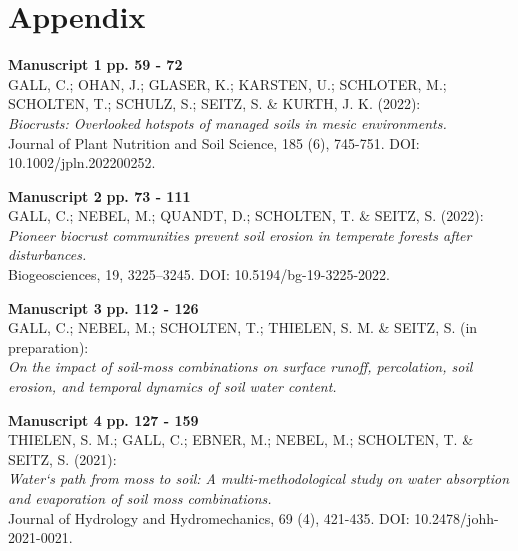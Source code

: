 \chapter*{Appendix}
\label{chap:appendix_overview} %


\noindent %
\textbf{Manuscript 1} \hfill \textbf{pp. 59 - 72} \\ %
GALL, C.; OHAN, J.; GLASER, K.; KARSTEN, U.; SCHLOTER, M.; SCHOLTEN, T.; SCHULZ, S.; SEITZ, S. \& KURTH, J. K. (2022): \\
\textit{Biocrusts: Overlooked hotspots of managed soils in mesic environments.} \\
Journal of Plant Nutrition and Soil Science, 185 (6), 745-751. DOI: 10.1002/jpln.202200252.

\vspace{\baselineskip} %

\noindent
\textbf{Manuscript 2} \hfill \textbf{pp. 73 - 111} \\ %
GALL, C.; NEBEL, M.; QUANDT, D.; SCHOLTEN, T. \& SEITZ, S. (2022): \\
\textit{Pioneer biocrust communities prevent soil erosion in temperate forests after disturbances.} \\
Biogeosciences, 19, 3225–3245. DOI: 10.5194/bg-19-3225-2022.

\vspace{\baselineskip}

\noindent
\textbf{Manuscript 3} \hfill \textbf{pp. 112 - 126} \\ %
GALL, C.; NEBEL, M.; SCHOLTEN, T.; THIELEN, S. M. \& SEITZ, S. (in preparation): \\
\textit{On the impact of soil-moss combinations on surface runoff, percolation, soil erosion, and temporal dynamics of soil water content.}

\vspace{\baselineskip}

\noindent
\textbf{Manuscript 4} \hfill \textbf{pp. 127 - 159} \\ %
THIELEN, S. M.; GALL, C.; EBNER, M.; NEBEL, M.; SCHOLTEN, T. \& SEITZ, S. (2021): \\
\textit{Water`s path from moss to soil: A multi-methodological study on water absorption and evaporation of soil moss combinations.} \\
Journal of Hydrology and Hydromechanics, 69 (4), 421-435. DOI: 10.2478/johh-2021-0021.

